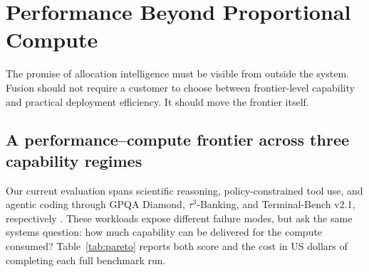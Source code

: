\section{Performance Beyond Proportional Compute}
\label{sec:evidence}

The promise of allocation intelligence must be visible from outside the
system. Fusion should not require a customer to choose between frontier-level
capability and practical deployment efficiency. It should move the frontier
itself.

\subsection{A performance--compute frontier across three capability regimes}

Our current evaluation spans scientific reasoning, policy-constrained tool use,
and agentic coding through GPQA Diamond, $\tau^3$-Banking, and Terminal-Bench
v2.1, respectively \citep{rein2024gpqa,shi2026tauknowledge,merrill2026terminalbench}.
These workloads expose different failure modes, but ask the same systems
question: how much capability can be delivered for the compute consumed?
Table~\ref{tab:pareto} reports both score and the cost in US dollars of
completing each full benchmark run.

